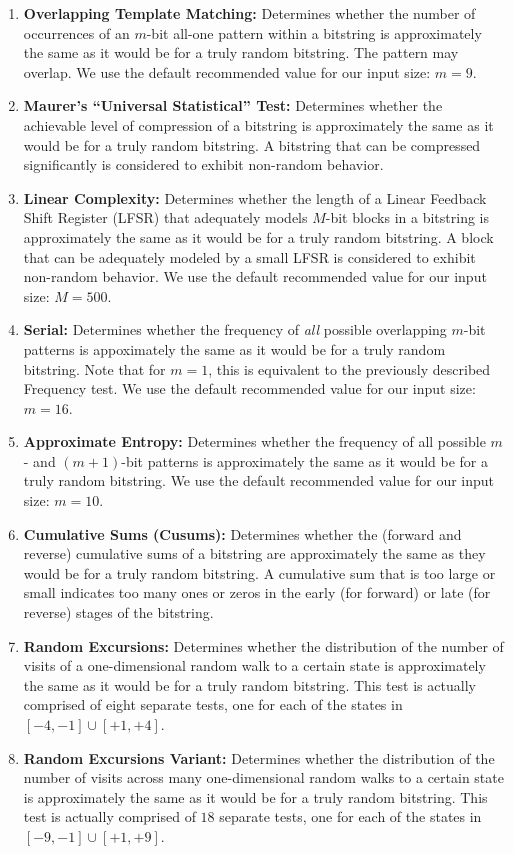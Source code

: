 \begin{enumerate}
\item \textbf{Overlapping Template Matching:} 
Determines whether the number of occurrences of an $m$-bit all-one pattern within a bitstring is approximately the same as it would be for a truly random bitstring.
The pattern may overlap.
We use the default recommended value for our input size: $m = 9$.

\item \textbf{Maurer's ``Universal Statistical'' Test:} 
Determines whether the achievable level of compression of a bitstring is approximately the same as it would be for a truly random bitstring.
A bitstring that can be compressed significantly is considered to exhibit non-random behavior.

\item \textbf{Linear Complexity:} 
Determines whether the length of a Linear Feedback Shift Register (LFSR) that adequately models $M$-bit blocks in a bitstring is approximately the same as it would be for a truly random bitstring.
A block that can be adequately modeled by a small LFSR is considered to exhibit non-random behavior.
We use the default recommended value for our input size: $M = 500$.

\item \textbf{Serial:} 
Determines whether the frequency of \emph{all} possible overlapping $m$-bit patterns is appoximately the same as it would be for a truly random bitstring.
Note that for $m = 1$, this is equivalent to the previously described Frequency test.
We use the default recommended value for our input size: $m = 16$.

\item \textbf{Approximate Entropy:} 
Determines whether the frequency of all possible $m$- and $(m+1)$-bit patterns is approximately the same as it would be for a truly random bitstring.
We use the default recommended value for our input size: $m = 10$.

\item \textbf{Cumulative Sums (Cusums):} 
Determines whether the (forward and reverse) cumulative sums of a bitstring are approximately the same as they would be for a truly random bitstring.
A cumulative sum that is too large or small indicates too many ones or zeros in the early (for forward) or late (for reverse) stages of the bitstring.

\item \textbf{Random Excursions:} 
Determines whether the distribution of the number of visits of a one-dimensional random walk to a certain state is approximately the same as it would be for a truly random bitstring.
This test is actually comprised of eight separate tests, one for each of the states in $[-4,-1] \cup [+1,+4]$.

\item \textbf{Random Excursions Variant:} 
Determines whether the distribution of the number of visits across many one-dimensional random walks to a certain state is approximately the same as it would be for a truly random bitstring.
This test is actually comprised of $18$ separate tests, one for each of the states in $[-9,-1] \cup [+1,+9]$.
\end{enumerate}

